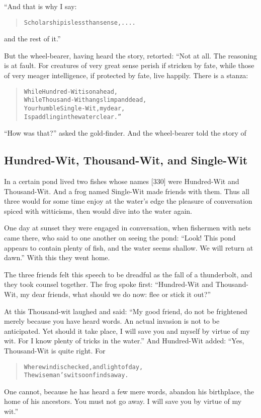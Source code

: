 \documentclass[article, twoside, 14pt]{memoir}
\renewenvironment{verbatim}{%
\begin{quote}%
\vskip -10pt%
\begin{alltt}\normalfont\large}{\end{alltt}%
\end{quote}%
\vskip -10pt
} %
\begin{document}
“And that is why I say:

\begin{verbatim}
Scholarship is less than sense, ....
\end{verbatim}
and the rest of it.”

But the wheel-bearer, having heard the story, retorted: “Not at
all. The reasoning is at fault. For creatures of very great sense
perish if stricken by fate, while those of very meager
intelligence, if protected by fate, live happily. There is a
stanza:

\begin{verbatim}
While Hundred-Wit is on a head,
While Thousand-Wit hangs limp and dead,
Your humble Single-Wit, my dear,
Is paddling in the water clear.”
\end{verbatim}
``How was that?'' asked the gold-finder. And the wheel-bearer told
the story of

\subsection{Hundred-Wit, Thousand-Wit, and Single-Wit}

\label{s83}

In a certain pond lived two fishes whose names [330] were
Hundred-Wit and Thousand-Wit. And a frog named Single-Wit made
friends with them. Thus all three would for some time enjoy at the
water's edge the pleasure of conversation spiced with witticisms,
then would dive into the water again.

One day at sunset they were engaged in conversation, when fishermen
with nets came there, who said to one another on seeing the pond:
``Look! This pond appears to contain plenty of fish, and the water seems shallow. We will return at dawn.''
With this they went home.

The three friends felt this speech to be dreadful as the fall of a
thunderbolt, and they took counsel together. The frog spoke first:
``Hundred-Wit and Thousand-Wit, my dear friends, what should we do now: flee or stick it out?''

At this Thousand-wit laughed and said:
``My good friend, do not be frightened merely because you have heard words. An actual invasion is not to be anticipated. Yet should it take place, I will save you and myself by virtue of my wit. For I know plenty of tricks in the water.''
And Hundred-Wit added: “Yes, Thousand-Wit is quite right. For

\begin{verbatim}
Where wind is checked, and light of day,
The wise man's wit soon finds a way.
\end{verbatim}
One cannot, because he has heard a few mere words, abandon his
birthplace, the home of his ancestors. You must not go away. I will
save you by virtue of my wit.”
\end{document}
